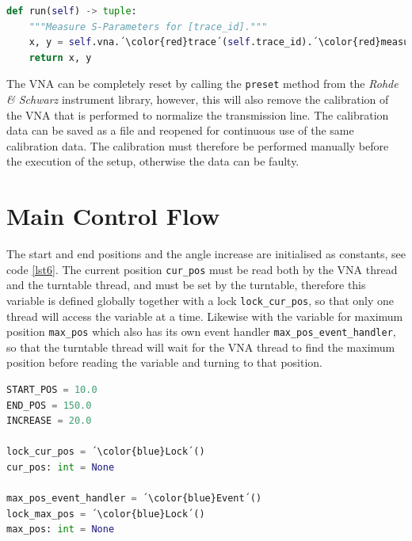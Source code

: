 \begin{lstlisting}[language=Python, caption=Method for getting measurements from VNA.]
def run(self) -> tuple:
    """Measure S-Parameters for [trace_id]."""
    x, y = self.vna.´\color{red}trace´(self.trace_id).´\color{red}measure\_formatted\_data´()
    return x, y
\end{lstlisting} \label{lst5} 

The VNA can be completely reset by calling the \verb+preset+ method from the \textit{Rohde \& Schwarz} instrument library, however, this will also remove the calibration of the VNA that is performed to normalize the transmission line. The calibration data can be saved as a file and reopened for continuous use of the same calibration data. The calibration must therefore be performed manually before the execution of the setup, otherwise the data can be faulty.

\section{Main Control Flow}
The start and end positions and the angle increase are initialised as constants, see code \ref{lst6}. The current position \verb+cur_pos+ must be read both by the VNA thread and the turntable thread, and must be set by the turntable, therefore this variable is defined globally together with a lock \verb+lock_cur_pos+, so that only one thread will access the variable at a time. Likewise with the variable for maximum position \verb+max_pos+ which also has its own event handler \verb+max_pos_event_handler+, so that the turntable thread will wait for the VNA thread to find the maximum position before reading the variable and turning to that position.
\begin{lstlisting}[language=Python, caption=Global constants and variables.]
START_POS = 10.0
END_POS = 150.0
INCREASE = 20.0

lock_cur_pos = ´\color{blue}Lock´()
cur_pos: int = None

max_pos_event_handler = ´\color{blue}Event´()
lock_max_pos = ´\color{blue}Lock´()
max_pos: int = None
\end{lstlisting} \label{lst6}

